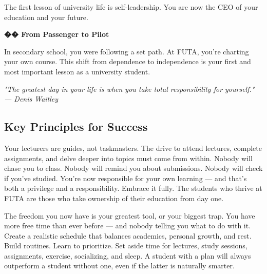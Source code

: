 \documentclass[11pt,a4paper]{article}
\newcommand{\quotetext}[1]{\begin{quotebox}\itshape\color{primary}#1\end{quotebox}}
\begin{document}
The first lesson of university life is self-leadership. You are now the CEO of your education and your future.

\begin{inspirational}
    \textbf{\color{primary}\Large �� From Passenger to Pilot}

    \vspace{0.5em}

    In secondary school, you were following a set path. At FUTA, you're charting your own course. This shift from dependence to independence is your first and most important lesson as a university student.

    \vspace{0.5em}

    \quotetext{"The greatest day in your life is when you take total responsibility for yourself." \\ --- Denis Waitley}
\end{inspirational}

\subsection{Key Principles for Success}

\begin{tcolorbox}[colback=lightGray,colframe=primary,title={\color{white}\textbf{You Are in Charge}},colbacktitle=primary,arc=4pt,breakable]
Your lecturers are guides, not taskmasters. The drive to attend lectures, complete assignments, and delve deeper into topics must come from within. Nobody will chase you to class. Nobody will remind you about submissions. Nobody will check if you've studied. You're now responsible for your own learning --- and that's both a privilege and a responsibility. Embrace it fully. The students who thrive at FUTA are those who take ownership of their education from day one.
\end{tcolorbox}

\begin{tcolorbox}[colback=lightGray,colframe=primary,title={\color{white}\textbf{Master Your Time}},colbacktitle=primary,arc=4pt,breakable]
The freedom you now have is your greatest tool, or your biggest trap. You have more free time than ever before --- and nobody telling you what to do with it. Create a realistic schedule that balances academics, personal growth, and rest. Build routines. Learn to prioritize. Set aside time for lectures, study sessions, assignments, exercise, socializing, and sleep. A student with a plan will always outperform a student without one, even if the latter is naturally smarter.
\end{tcolorbox}
\end{document}
